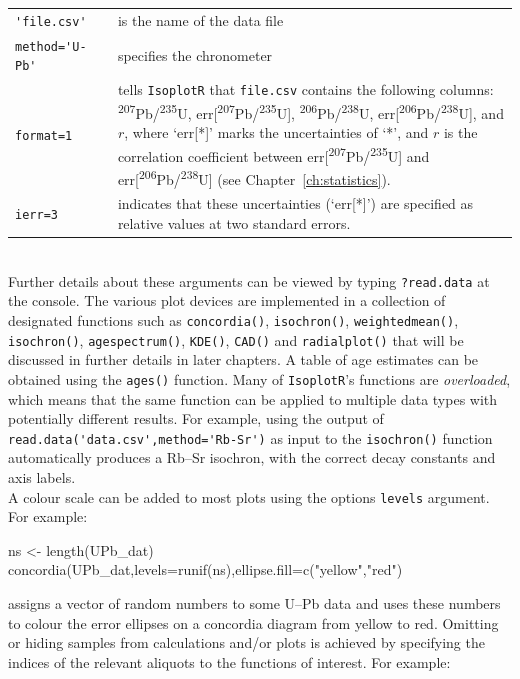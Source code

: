 \begin{refsection}
\noindent\begin{tabular}{@{}p{}@{}p{}@{}p{}@{}}
\verb|'file.csv'| && is the name of the data
file\\ \verb|method='U-Pb'| && specifies the
chronometer\\ \verb|format=1| && tells \texttt{IsoplotR} that
\verb|file.csv| contains the following columns:
\textsuperscript{207}Pb/\textsuperscript{235}U,
err[\textsuperscript{207}Pb/\textsuperscript{235}U],
\textsuperscript{206}Pb/\textsuperscript{238}U,
err[\textsuperscript{206}Pb/\textsuperscript{238}U], and $r$, where
`err[*]' marks the uncertainties of `*', and $r$ is the correlation
coefficient between
err[\textsuperscript{207}Pb/\textsuperscript{235}U] and
err[\textsuperscript{206}Pb/\textsuperscript{238}U] (see
Chapter~\ref{ch:statistics}).\\ \verb|ierr=3| && indicates that these
uncertainties (`err[*]') are specified as relative values at two
standard errors.
\end{tabular}\\

\noindent Further details about these arguments can be viewed by
typing \texttt{?read.data} at the console. The various plot devices
are implemented in a collection of designated functions such as
\texttt{concordia()}, \texttt{isochron()}, \texttt{weightedmean()},
\texttt{isochron()}, \texttt{agespectrum()}, \texttt{KDE()},
\texttt{CAD()} and \texttt{radialplot()} that will be discussed in
further details in later chapters. A table of age estimates can be
obtained using the \texttt{ages()} function. Many of
\texttt{IsoplotR}'s functions are \emph{overloaded}, which means that
the same function can be applied to multiple data types with
potentially different results. For example, using the output of
\verb|read.data('data.csv',method='Rb-Sr')| as input to the
\texttt{isochron()} function automatically produces a Rb--Sr isochron,
with the correct decay constants and axis labels.\\

A colour scale can be added to most plots using the options
\texttt{levels} argument. For example:

\begin{script}[firstnumber=2]
ns <- length(UPb_dat)
concordia(UPb_dat,levels=runif(ns),ellipse.fill=c("yellow","red")
\end{script}

\noindent assigns a vector of random numbers to some U--Pb data and
uses these numbers to colour the error ellipses on a concordia diagram
from yellow to red. Omitting or hiding samples from calculations
and/or plots is achieved by specifying the indices of the relevant
aliquots to the functions of interest. For example:


\end{refsection}
